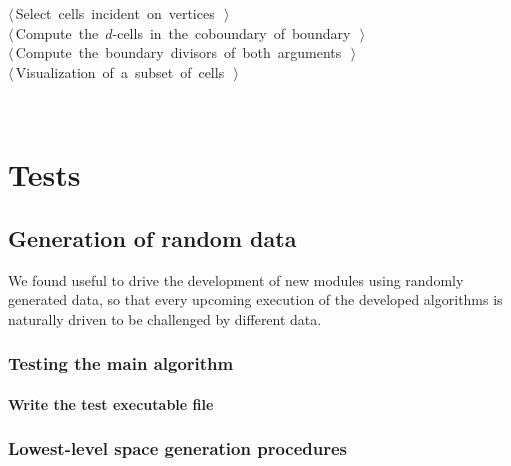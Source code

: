 \documentclass[11pt,oneside]{article}	%
\begin{document}
\begin{flushleft}
\begin{minipage}{\linewidth}
\begin{list}{}{}
\mbox{}\verb@@\hbox{$\langle\,$Select cells incident on vertices\nobreak\ {\footnotesize {}}$\,\rangle$}\verb@@\\
\mbox{}\verb@@\hbox{$\langle\,$Compute the $d$-cells in the coboundary of boundary\nobreak\ {\footnotesize {}}$\,\rangle$}\verb@@\\
\mbox{}\verb@@\hbox{$\langle\,$Compute the boundary divisors of both arguments\nobreak\ {\footnotesize {}}$\,\rangle$}\verb@@\\
\mbox{}\verb@@\hbox{$\langle\,$Visualization of a subset of cells\nobreak\ {\footnotesize {}}$\,\rangle$}\verb@@\\
\mbox{}\verb@@{\NWsep}
\end{list}
\vspace{-2ex}
\end{minipage}\\[4ex]
\end{flushleft}

\section{Tests}
\subsection{Generation of random data}

We found useful to drive the development of new modules using randomly generated data, so that every upcoming execution of the developed algorithms is naturally driven to be challenged by different data.

\subsubsection{Testing the main algorithm}

\paragraph{Write the test executable file}




\subsubsection{Lowest-level space generation procedures}
\end{document}
